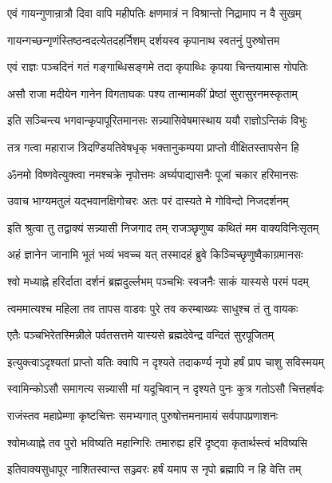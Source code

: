 \twolineshloka
{एवं गायन्गुणान्रात्रौ दिवा वापि महीपतिः}
{क्षणमात्रं न विश्रान्तो निद्रामाप न वै सुखम्}%

\twolineshloka
{गायन्गच्छन्गृणंस्तिष्ठन्वदत्येतदहर्निशम्}
{दर्शयस्व कृपानाथ स्वतनुं पुरुषोत्तम}%

\twolineshloka
{एवं राज्ञः पञ्चदिनं गतं गङ्गाब्धिसङ्गमे}
{तदा कृपाब्धिः कृपया चिन्तयामास गोपतिः}%

\twolineshloka
{असौ राजा मदीयेन गानेन विगताघकः}
{पश्य तान्मामकीं प्रेष्ठां सुरासुरनमस्कृताम्}%

\twolineshloka
{इति सञ्चिन्त्य भगवान्कृपापूरितमानसः}
{सन्न्यासिवेषमास्थाय ययौ राज्ञोऽन्तिकं विभुः}%

\twolineshloka
{तत्र गत्वा महाराज त्रिदण्डियतिवेषधृक्}
{भक्तानुकम्पया प्राप्तो वीक्षितस्तापसेन हि}%

\twolineshloka
{ॐनमो विष्णवेत्युक्त्वा नमश्चक्रे नृपोत्तमः}
{अर्घ्यपाद्यासनैः पूजां चकार हरिमानसः}%

\twolineshloka
{उवाच भाग्यमतुलं यद्भवानक्षिगोचरः}
{अतः परं दास्यते मे गोविन्दो निजदर्शनम्}%

\twolineshloka
{इति श्रुत्वा तु तद्वाक्यं सन्न्यासी निजगाद तम्}
{राजञ्छृणुष्व कथितं मम वाक्यविनिःसृतम्}%

\twolineshloka
{अहं ज्ञानेन जानामि भूतं भव्यं भवच्च यत्}
{तस्मादहं ब्रुवे किञ्चिच्छृणुष्वैकाग्रमानसः}%

\twolineshloka
{श्वो मध्याह्ने हरिर्दाता दर्शनं ब्रह्मदुर्ल्लभम्}
{पञ्चभिः स्वजनैः साकं यास्यसे परमं पदम्}%

\twolineshloka
{त्वममात्यश्च महिला तव तापस वाडवः}
{पुरे तव करम्बाख्यः साधुश्च तं तु वायकः}%

\twolineshloka
{एतैः पञ्चभिरेतस्मिन्नीले पर्वतसत्तमे}
{यास्यसे ब्रह्मदेवेन्द्र वन्दितं सुरपूजितम्}%

\twolineshloka
{इत्युक्त्वाऽदृश्यतां प्राप्तो यतिः क्वापि न दृश्यते}
{तदाकर्ण्य नृपो हर्षं प्राप चाशु सविस्मयम्}%


\twolineshloka
{स्वामिन्कोऽसौ समागत्य सन्न्यासी मां यदूचिवान्}
{न दृश्यते पुनः कुत्र गतोऽसौ चित्तहर्षदः}%


\twolineshloka
{राजंस्तव महाप्रेम्णा कृष्टचित्तः समभ्यगात्}
{पुरुषोत्तमनामायं सर्वपापप्रणाशनः}%

\twolineshloka
{श्वोमध्याह्ने तव पुरो भविष्यति महान्गिरिः}
{तमारुह्य हरिं दृष्ट्वा कृतार्थस्त्वं भविष्यसि}%

\twolineshloka
{इतिवाक्यसुधापूर नाशितस्वान्त सञ्ज्वरः}
{हर्षं यमाप स नृपो ब्रह्मापि न हि वेत्ति तम्}%

